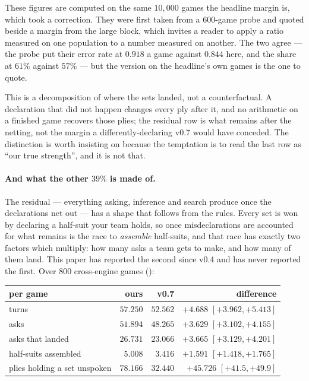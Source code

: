 \documentclass[11pt,a4paper]{article}
\begin{document}
These figures are computed on the same $10{,}000$ games the headline margin
is, which took a correction. They were first taken from a $600$-game probe
and quoted beside a margin from the large block, which invites a reader to
apply a ratio measured on one population to a number measured on another.
The two agree --- the probe put their error rate at $0.918$ a game against
$0.844$ here, and the share at $61\%$ against $57\%$ --- but the version on
the headline's own games is the one to quote.

This is a decomposition of where the sets landed, not a counterfactual. A
declaration that did not happen changes every ply after it, and no arithmetic
on a finished game recovers those plies; the residual row is what remains
after the netting, not the margin a differently-declaring v0.7 would have
conceded. The distinction is worth insisting on because the temptation is to
read the last row as ``our true strength'', and it is not that.

\paragraph{And what the other $39\%$ is made of.} The residual --- everything
asking, inference and search produce once the declarations net out --- has a
shape that follows from the rules. Every set is won by declaring a half-suit
your team holds, so once misdeclarations are accounted for what remains is the
race to \emph{assemble} half-suits, and that race has exactly two factors which
multiply: how many asks a team gets to make, and how many of them land. This
paper has reported the second since v0.4 and has never reported the first.
Over $800$ cross-engine games ():

\begin{center}
\small
\begin{tabular}{lrrr}
\toprule
per game & ours & v0.7 & difference \\
\midrule
turns & $57.250$ & $52.562$ & $\mathbf{+4.688}$ $[+3.962, +5.413]$ \\
asks & $51.894$ & $48.265$ & $+3.629$ $[+3.102, +4.155]$ \\
asks that landed & $26.731$ & $23.066$ & $+3.665$ $[+3.129, +4.201]$ \\
half-suits assembled & $5.008$ & $3.416$ & $+1.591$ $[+1.418, +1.765]$ \\
plies holding a set unspoken & $78.166$ & $32.440$ & $+45.726$ $[+41.5, +49.9]$ \\
\bottomrule
\end{tabular}
\end{center}
\end{document}
